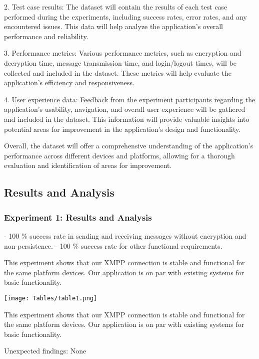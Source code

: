 \documentclass[12pt]{article}
\begin{document}
2. Test case results: The dataset will contain the results of each test case performed during the experiments, including success rates, error rates, and any encountered issues. This data will help analyze the application's overall performance and reliability.

3. Performance metrics: Various performance metrics, such as encryption and decryption time, message transmission time, and login/logout times, will be collected and included in the dataset. These metrics will help evaluate the application's efficiency and responsiveness.

4. User experience data: Feedback from the experiment participants regarding the application's usability, navigation, and overall user experience will be gathered and included in the dataset. This information will provide valuable insights into potential areas for improvement in the application's design and functionality.

Overall, the dataset will offer a comprehensive understanding of the application's performance across different devices and platforms, allowing for a thorough evaluation and identification of areas for improvement.



\subsection{Results and Analysis}\label{sec:results}
   \subsubsection{Experiment 1: Results and Analysis}
- 100 \% success rate in sending and receiving messages without encryption and non-persistence.
- 100 \% success rate for other functional requirements.

This experiment shows that our XMPP connection is stable and functional for the same platform devices. Our application is on par with existing systems for basic functionality.


\begin{center}
\texttt{[image: Tables/table1.png]}
\end{center}

\RaggedRight This experiment shows that our XMPP connection is stable and functional for the same platform devices. Our application is on par with existing systems for basic functionality.

Unexpected findings: None
\end{document}
